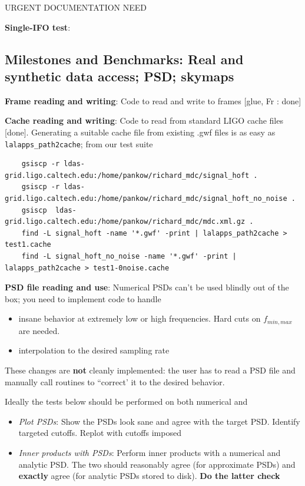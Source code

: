 \documentclass[twocolumn,prd,nofootinbib]{revtex4}
\newcommand\editremark[1]{{\color{red} #1}}
\begin{document}
\begin{widetext}
\begin{widetext}
\editremark{URGENT DOCUMENTATION NEED}

\noindent \textbf{Single-IFO test}: 

\subsection{Milestones and Benchmarks: Real and synthetic data access; PSD; skymaps}

\noindent \textbf{Frame reading and writing}: Code to read and write to frames [glue, Fr : done]

\noindent \textbf{Cache reading and writing}: Code to read from standard LIGO cache files [done].  Generating a suitable
cache file from existing .gwf files is as easy as \texttt{lalapps\_path2cache}; from our test suite
\begin{shaded}
\begin{verbatim}
	gsiscp -r ldas-grid.ligo.caltech.edu:/home/pankow/richard_mdc/signal_hoft .
	gsiscp -r ldas-grid.ligo.caltech.edu:/home/pankow/richard_mdc/signal_hoft_no_noise .
	gsiscp  ldas-grid.ligo.caltech.edu:/home/pankow/richard_mdc/mdc.xml.gz .
	find -L signal_hoft -name '*.gwf' -print | lalapps_path2cache > test1.cache
	find -L signal_hoft_no_noise -name '*.gwf' -print | lalapps_path2cache > test1-0noise.cache
\end{verbatim}
\end{shaded}

\noindent \textbf{PSD file reading and use}: Numerical PSDs can't be used blindly out of the box; you need to implement
code to handle
\begin{itemize}
\item  insane behavior at extremely low or
high frequencies.  Hard cuts on $f_{min,max}$ are needed.  
\item interpolation to the desired sampling rate
\end{itemize}
These changes are \textbf{not} cleanly implemented: the user has to read a PSD file and manually call routines to
``correct' it to the desired behavior.

Ideally the tests below should be performed on both numerical and 
\begin{itemize}
\item \emph{Plot PSDs}: Show the PSDs look sane and agree with the target PSD.  Identify targeted cutoffs.  Replot with cutoffs imposed
\item \emph{Inner products with PSDs}: Perform inner products with a numerical and analytic PSD.  The two should
  reasonably agree (for approximate PSDs) and \textbf{exactly} agree (for analytic PSDs stored to disk). \textbf{Do the
    latter check}
\end{itemize}


\end{widetext}
\end{widetext}
\end{document}

